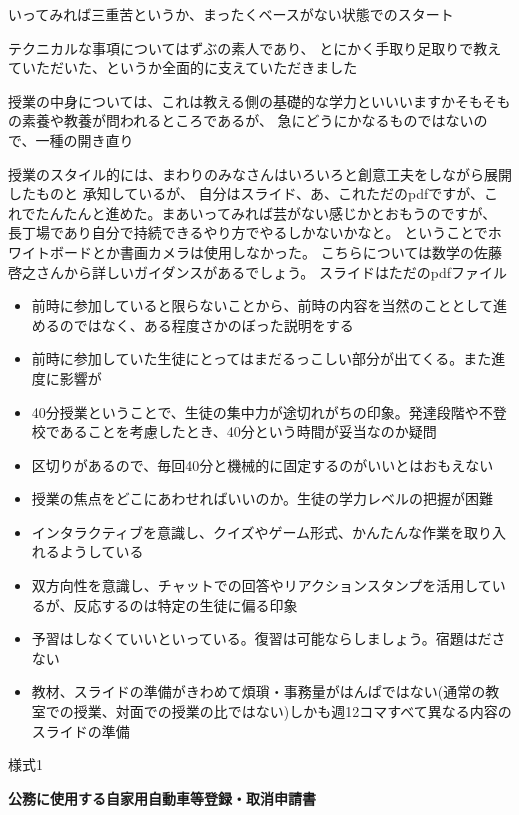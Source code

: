 \documentclass[12pt,jafontscale=0.9247]{jlreq}
\begin{document}
いってみれば三重苦というか、まったくベースがない状態でのスタート

テクニカルな事項についてはずぶの素人であり、
とにかく手取り足取りで教えていただいた、というか全面的に支えていただきました

授業の中身については、これは教える側の基礎的な学力といいいますかそもそもの素養や教養が問われるところであるが、
急にどうにかなるものではないので、一種の開き直り

授業のスタイル的には、まわりのみなさんはいろいろと創意工夫をしながら展開したものと
承知しているが、
自分はスライド、あ、これただのpdfですが、これでたんたんと進めた。まあいってみれば芸がない感じかとおもうのですが、
長丁場であり自分で持続できるやり方でやるしかないかなと。
ということでホワイトボードとか書画カメラは使用しなかった。
こちらについては数学の佐藤啓之さんから詳しいガイダンスがあるでしょう。
スライドはただのpdfファイル

\begin{itemize}
 \item 前時に参加していると限らないことから、前時の内容を当然のこととして進めるのではなく、ある程度さかのぼった説明をする
 \item 前時に参加していた生徒にとってはまだるっこしい部分が出てくる。また進度に影響が
 \item 40分授業ということで、生徒の集中力が途切れがちの印象。発達段階や不登校であることを考慮したとき、40分という時間が妥当なのか疑問
 \item 区切りがあるので、毎回40分と機械的に固定するのがいいとはおもえない
 \item 授業の焦点をどこにあわせればいいのか。生徒の学力レベルの把握が困難
 \item インタラクティブを意識し、クイズやゲーム形式、かんたんな作業を取り入れるようしている
 \item 双方向性を意識し、チャットでの回答やリアクションスタンプを活用しているが、反応するのは特定の生徒に偏る印象
 \item 予習はしなくていいといっている。復習は可能ならしましょう。宿題はださない
 \item 教材、スライドの準備がきわめて煩瑣・事務量がはんぱではない(通常の教室での授業、対面での授業の比ではない)しかも週12コマすべて異なる内容のスライドの準備
\end{itemize}


\newpage
\thispagestyle{empty}

\noindent{}様式1\hfill\mbox{}


\mbox{}\hfill{\bfseries 公務に使用する自家用自動車等登録・取消申請書}\hfill\mbox{}
\end{document}
